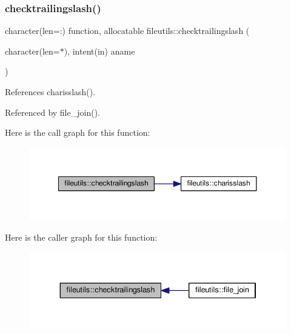 \subsubsection{\texorpdfstring{checktrailingslash()}{checktrailingslash()}}
{\footnotesize\ttfamily character(len=\+:) function, allocatable fileutils\+::checktrailingslash (\begin{DoxyParamCaption}\item[{character(len=$\ast$), intent(in)}]{aname }\end{DoxyParamCaption})\hspace{0.3cm}{\ttfamily [private]}}



References charisslash().



Referenced by file\+\_\+join().

Here is the call graph for this function\+:
\nopagebreak
\begin{figure}[H]
\begin{center}
\leavevmode
\includegraphics[width=350pt]{namespacefileutils_a61ab2a304f35a84f39731548b11393a2_cgraph}
\end{center}
\end{figure}
Here is the caller graph for this function\+:
\nopagebreak
\begin{figure}[H]
\begin{center}
\leavevmode
\includegraphics[width=334pt]{namespacefileutils_a61ab2a304f35a84f39731548b11393a2_icgraph}
\end{center}
\end{figure}
\mbox{\label{namespacefileutils_a91600ec19776dc37a388c71d74c6e0bf}} 
